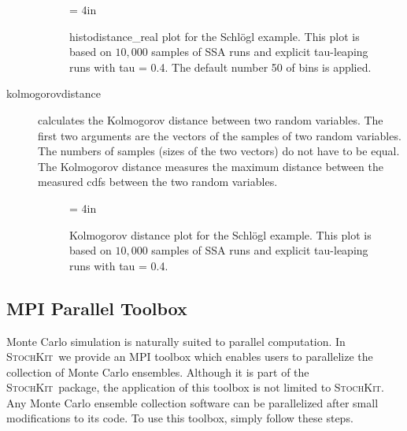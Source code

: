 \documentclass[12pt]{article}
\newcommand{\sspack}{\textsc{StochKit}}
\begin{document}
\begin{description}
\begin{figure}
\begin{center}
\epsfxsize = 4in
\caption{   \label{schloglrealdistance}
histodistance\_real plot for the Schl\"ogl example.
This plot is based on $10,000$ samples of SSA runs and
explicit tau-leaping runs with tau = 0.4. The
    default number 50 of bins is applied. }
\end{center}
\end{figure}

\item[kolmogorovdistance] calculates the Kolmogorov distance between two random variables.
The first two arguments are the vectors of the samples of two random variables. The numbers of samples
(sizes of the two vectors) do not have to be equal. The Kolmogorov distance measures the maximum
distance between the measured cdfs between the two random variables.


\begin{figure}
\begin{center}
\epsfxsize = 4in
\caption{   \label{schloglkolmogorovdistance}
Kolmogorov distance plot for the Schl\"ogl example. This plot is based on
$10,000$ samples of SSA runs and
explicit tau-leaping runs with tau = 0.4. }
\end{center}
\end{figure}

\end{description}

\subsection{MPI Parallel Toolbox}
Monte Carlo simulation is naturally suited to parallel computation. In
\sspack \ we provide an MPI toolbox which enables users to parallelize
the collection of Monte Carlo ensembles. Although it is part of
the \sspack\ package, the application of this toolbox is not limited
to \sspack. Any Monte Carlo ensemble collection software can be parallelized after
small modifications to its code. To use this toolbox, simply follow these steps.
\end{document}
